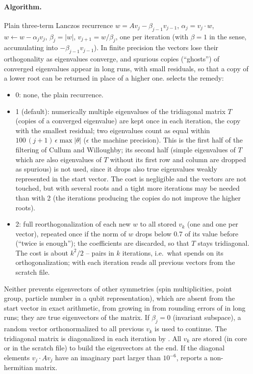 \paragraph{Algorithm.} Plain three-term Lanczos recurrence $w=Av_j-\beta_{j-1}v_{j-1}$, $\alpha_j=v_j\cdot w$,
$w\leftarrow w-\alpha_jv_j$, $\beta_j=|w|$, $v_{j+1}=w/\beta_j$, one  per iteration (with $\beta=1$ in the
 sense, accumulating into $-\beta_{j-1}v_{j-1}$). In finite precision the vectors lose their orthogonality as
eigenvalues converge, and spurious copies (``ghosts'') of converged eigenvalues appear in long runs, with small residuals,
so that a copy of a lower root can be returned in place of a higher one.  selects the remedy:
\begin{itemize}
\item 0: none, the plain recurrence.
\item 1 (default): numerically multiple eigenvalues of the tridiagonal matrix $T$ (copies of a converged eigenvalue) are kept
  once in each iteration, the copy with the smallest residual; two eigenvalues count as equal within
  $100\,(j+1)\,\epsilon\max|\theta|$ ($\epsilon$ the machine precision). This is the first half of the filtering of Cullum and
  Willoughby; its second half (simple eigenvalues of $T$ which are also eigenvalues of $T$ without its first row and column are
  dropped as spurious) is not used, since it drops also true eigenvalues weakly represented in the start vector. The cost is
  negligible and the vectors are not touched, but with several roots and a tight  more iterations may be needed than
  with 2 (the iterations producing the copies do not improve the higher roots).
\item 2: full reorthogonalization of each new $w$ to all stored $v_k$ (one  and one  per vector), repeated
  once if the norm of $w$ drops below 0.7 of its value before (``twice is enough''); the coefficients are discarded, so that
  $T$ stays tridiagonal. The cost is about $k^2/2$ -- pairs in $k$ iterations, i.e.\ what 
  spends on its orthogonalization; with  each iteration reads all previous vectors from the scratch file.
\end{itemize}
Neither prevents eigenvectors of other symmetries (spin multiplicities, point group, particle number in a qubit
representation), which are absent from the start vector in exact arithmetic, from growing in from rounding errors of
 in long runs; they are true eigenvectors of the matrix. If $\beta_j=0$ (invariant
subspace), a random vector orthonormalized to all previous $v_k$ is used to continue. The tridiagonal matrix is diagonalized
in each iteration by . All $v_k$ are stored (in core or in the scratch file) to build the eigenvectors at the
end. If the diagonal elements $v_j\cdot Av_j$ have an imaginary part larger than $10^{-6}$,  reports a
non-hermitian matrix.

